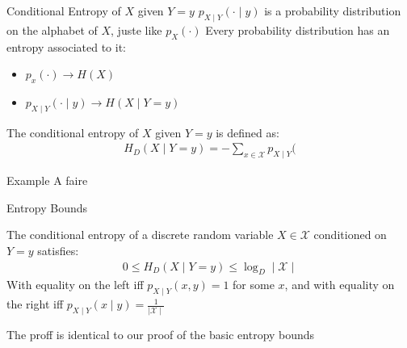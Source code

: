  
 \begin{parag}{Conditional Entropy of $X$ given $Y = y$}
     $p_{X \mid Y}( \cdot \mid  y)$ is a probability distribution on the alphabet of $X$, juste like $p_X( \cdot)$ Every probability distribution has an entropy associated to it:
     \begin{itemize}
         \item $p_x( \cdot) \to H(X)$
         \item $p_{ X \mid  Y}( \cdot \mid y) \to H(X \mid Y = y)$
     \end{itemize}
     \begin{definition}
         The conditional entropy of $X$ given $Y = y$ is defined as:
         \begin{align*}
             H_D ( X \mid Y = y) = - \sum_{x \in \mathcal{X}} p_{X \mid Y}(
         \end{align*}
         
     \end{definition}
     \begin{subparag}{Example}
         A faire
         
     \end{subparag}
 
 \end{parag}
 \begin{parag}{Entropy Bounds}

     \begin{theoreme}
         The conditional entropy of a discrete random variable $X\in \mathcal{X}$ conditioned on $Y = y$ satisfies:
         \begin{align*}
             0 \leq H_D(X \mid Y = y) \leq \log_D \mid \mathcal{X} \mid
         \end{align*}
     With equality on the left iff $p_{X \mid Y}(x, y) = 1$ for some $x$, and with equality on the right iff $p_{X \mid Y}(x \mid y) = \frac{1}{\mid \mathcal{X}\mid }$
         
     \end{theoreme}
     The proff is identical to our proof of the basic entropy bounds
 
 \end{parag}
 
